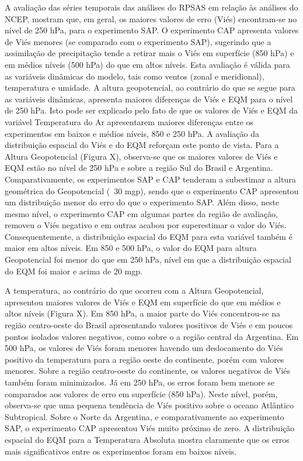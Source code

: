 A avaliação das séries temporais das análises do RPSAS em relação às análises do NCEP, mostram que, em geral, os maiores valores de erro (Viés) encontram-se no nível de 250 hPa, para o experimento SAP. O experimento CAP apresenta valores de Viés menores (se comparado com o experimento SAP), sugerindo que a assimilação de precipitação tende a retirar mais o Viés em superfície (850 hPa) e em médios níveis (500 hPa) do que em altos níveis. Esta avaliação é válida para as variáveis dinâmicas do modelo, tais como ventos (zonal e meridional), temperatura e umidade. A altura geopotencial, ao contrário do que se segue para as variáveis dinâmicas, apresenta maiores diferenças de Viés e EQM para o nível de 250 hPa. Isto pode ser explicado pelo fato de que os valores de Viés e EQM da variável Temperatura do Ar apresentarem maiores diferenças entre os experimentos em baixos e médios níveis, 850 e 250 hPa. A avaliação da distribuição espacial do Viés e do EQM reforçam este ponto de vista. Para a Altura Geopotencial (Figura X), observa-se que os maiores valores de Viés e EQM estão no nível de 250 hPa e sobre a região Sul do Brasil e Argentina. Comparativamente, os experimentos SAP e CAP tenderam a subestimar a altura geométrica do Geopotencial (~30 mgp), sendo que o experimento CAP apresentou um distribuição menor do erro do que o experimento SAP. Além disso, neste mesmo nível, o experimento CAP em algumas partes da região de avaliação, removeu o Viés negativo e em outras acabou por superestimar o valor do Viés. Consequentemente, a distribuição espacial do EQM para esta variável também é maior em altos níveis. Em 850 e 500 hPa, o valor do EQM para altura Geopotencial foi menor do que em 250 hPa, nível em que a distribuição espacial do EQM foi maior e acima de 20 mgp.

A temperatura, ao contrário do que ocorreu com a Altura Geopotencial, apresentou maiores valores de Viés e EQM em superfície do que em médios e altos níveis (Figura X). Em 850 hPa, a maior parte do Viés concentrou-se na região centro-oeste do Brasil apresentando valores positivos de Viés e em poucos pontos isolados valores negativos, como sobre o a região central da Argentina. Em 500 hPa, os valores de Viés foram menores havendo um deslocamento do Viés positivo da temperatura para a região oeste do continente, porém com valores menores. Sobre a região centro-oeste do continente, os valores negativos de Viés também foram minimizados. Já em 250 hPa, os erros foram bem menore se comparados aos valores de erro em superfície (850 hPa). Neste nível, porém, observa-se que uma pequena tendência de Viés positivo sobre o oceano Atlântico Subtropical. Sobre o Norte da Argentina, e comparativamente ao experimento SAP, o experimento CAP apresentou Viés muito próximo de zero. A distribuição espacial do EQM para a Temperatura Absoluta mostra claramente que os erros mais significativos entre os experimentos foram em baixos níveis.

